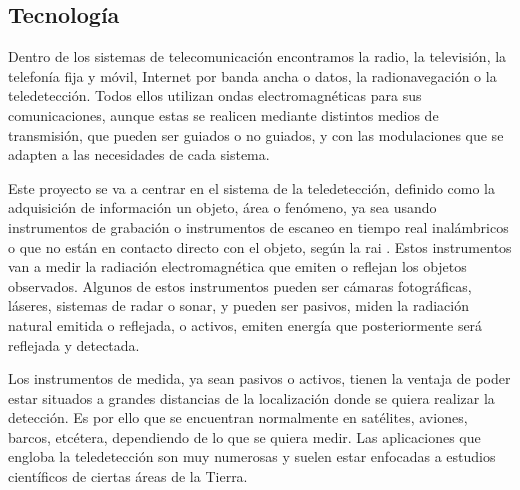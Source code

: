 \subsection{Tecnología}
\par Dentro de los sistemas de telecomunicación encontramos la radio, la televisión, la telefonía fija y móvil, Internet por banda ancha o datos, la radionavegación o la teledetección. Todos ellos utilizan ondas electromagnéticas para sus comunicaciones, aunque estas se realicen mediante distintos medios de transmisión, que pueden ser guiados o no guiados, y con las modulaciones que se adapten a las necesidades de cada sistema. 
\\
\par Este proyecto se va a centrar en el sistema de la teledetección, definido como la adquisición de información un objeto, área o fenómeno, ya sea usando instrumentos de grabación o instrumentos de escaneo en tiempo real inalámbricos o que no están en contacto directo con el objeto, según la \gls{rai} \cite{RAI}. Estos instrumentos van a medir la radiación electromagnética que emiten o reflejan los objetos observados. Algunos de estos instrumentos pueden ser cámaras fotográficas, láseres, sistemas de radar o sonar, y pueden ser pasivos, miden la radiación natural emitida o reflejada, o activos, emiten energía que posteriormente será reflejada y detectada.
\\
\par Los instrumentos de medida, ya sean pasivos o activos, tienen la ventaja de poder estar situados a grandes distancias de la localización donde se quiera realizar la detección. Es por ello que se encuentran normalmente en satélites, aviones, barcos, etcétera, dependiendo de lo que se quiera medir. Las aplicaciones que engloba la teledetección son muy numerosas y suelen estar enfocadas a estudios científicos de ciertas áreas de la Tierra. 
